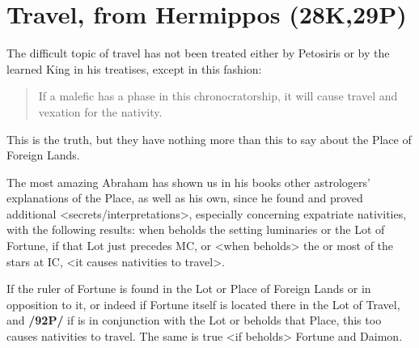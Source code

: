 \section{Travel, from Hermippos (28K,29P)}

The difficult topic of travel has not been treated either by Petosiris or by the learned King in his treatises, except in this fashion: \begin{quote}If a malefic has a phase in this chronocratorship, it will cause travel and vexation for the nativity.\end{quote} This is the truth, but they have nothing more than this to say about the Place of Foreign Lands. 

The most amazing Abraham has shown us in his books other astrologers’ explanations of the Place, as well as his own, since he found and proved additional <secrets/interpretations>, especially concerning expatriate nativities, with the following results: when \Mars\xspace beholds the setting luminaries or
the Lot of Fortune, if that Lot just precedes MC, or <when \Mars\xspace beholds> the \Moon\xspace or most of the stars at
IC, <it causes nativities to travel>. 

If the ruler of Fortune is found in the Lot or Place of Foreign Lands or in opposition to it, or indeed if Fortune itself is located there in the Lot of Travel, and \textbf{/92P/} if \Mars\xspace is in conjunction with the Lot or beholds that Place, this too causes nativities to travel. The same is true <if \Mars\xspace beholds> Fortune and Daimon.


\newpage